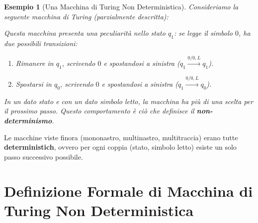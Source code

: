 \documentclass[a4paper]{article}
\newtheorem{example}{Esempio}
\newcommand{\blankS}{\ensuremath{\square}}
\begin{document}
\begin{example}[Una Macchina di Turing Non Deterministica]
Consideriamo la seguente macchina di Turing (parzialmente descritta):
\begin{center}
\end{center}
Questa macchina presenta una peculiarità nello stato $q_1$: se legge il simbolo $0$, ha due possibili transizioni:
\begin{enumerate}
    \item Rimanere in $q_1$, scrivendo $0$ e spostandosi a sinistra ($q_1 \xrightarrow{0/0, L} q_1$).
    \item Spostarsi in $q_0$, scrivendo $0$ e spostandosi a sinistra ($q_1 \xrightarrow{0/0, L} q_0$).
\end{enumerate}
In un dato stato e con un dato simbolo letto, la macchina ha più di una scelta per il prossimo passo. Questo comportamento è ciò che definisce il \textbf{non-determinismo}.
\end{example}

Le macchine viste finora (mononastro, multinastro, multitraccia) erano tutte \textbf{deterministich}, ovvero per ogni coppia (stato, simbolo letto) esiste un solo passo successivo possibile.

\section{Definizione Formale di Macchina di Turing Non Deterministica}
\end{document}
